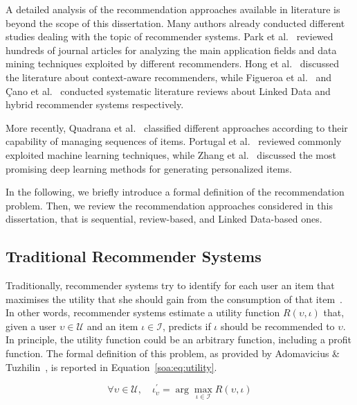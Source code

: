 A detailed analysis of the recommendation approaches available in literature is beyond the scope of this dissertation. Many authors already conducted different studies dealing with the topic of recommender systems. Park et al.~\cite{Park2012} reviewed hundreds of journal articles for analyzing the main application fields and data mining techniques exploited by different recommenders. Hong et al.~\cite{Hong2009} discussed the literature about context-aware recommenders, while Figueroa et al.~\cite{Figueroa2015} and Çano et al.~\cite{Cano2017} conducted systematic literature reviews about Linked Data and hybrid recommender systems respectively.

More recently, Quadrana et al.~\cite{Quadrana2018} classified different approaches according to their capability of managing sequences of items. Portugal et al.~\cite{Portugal2018} reviewed commonly exploited machine learning techniques, while Zhang et al.~\cite{Zhang2019} discussed the most promising deep learning methods for generating personalized items.

In the following, we briefly introduce a formal definition of the recommendation problem. Then, we review the recommendation approaches considered in this dissertation, that is sequential, review-based, and Linked Data-based ones. 

\subsection{Traditional Recommender Systems}
\label{soa:sec:traditional}

Traditionally, recommender systems try to identify for each user an item that maximises the utility that she should gain from the consumption of that item~\cite{Bobadilla2013}. In other words, recommender systems estimate a utility function $R(\upsilon, \iota)$ that, given a user $\upsilon \in \mathcal{U}$ and an item $\iota \in \mathcal{I}$, predicts if $\iota$ should be recommended to $\upsilon$. In principle, the utility function could be an arbitrary function, including a profit function. The formal definition of this problem, as provided by Adomavicius \& Tuzhilin~\cite{Adomavicius2015}, is reported in Equation~\ref{soa:eq:utility}.

\begin{equation}
\forall \upsilon \in \mathcal{U}, \quad \iota^{\prime}_{\upsilon} = \arg \max \limits_{\iota \in \mathcal{I}} R(\upsilon, \iota)
\label{soa:eq:utility}
\end{equation}

